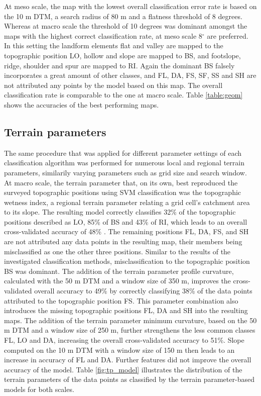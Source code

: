 \documentclass[preprint,12pt,authoryear]{elsarticle}
\begin{document}
At meso scale, the map with the lowest overall classification error rate is based on the 10 m DTM, a search radius of 80 m and a flatness threshold of 8 degrees. Whereas at macro scale the threshold of 10 degrees was dominant amongst the maps with the highest correct classification rate, at meso scale 8$^{\circ}$ are preferred. In this setting the landform elements flat and valley are mapped to the topographic position LO, hollow and slope are mapped to BS, and footslope, ridge, shoulder and spur are mapped to RI. Again the dominant BS falsely incorporates a great amount of other classes, and FL, DA, FS, SF, SS and SH are not attributed any points by the model based on this map. The overall classification rate is comparable to the one at macro scale.  Table \ref{table:geom} shows the accuracies of the best performing maps.

\subsection{Terrain parameters}
The same procedure that was applied for different parameter settings of each classification algorithm was performed for  numerous local and regional terrain parameters, similarily varying parameters such as grid size and search window. At macro scale, the terrain parameter that, on its own, best reproduced the surveyed topographic positions using SVM classification was the topographic wetness index, a regional terrain parameter relating a grid cell's catchment area to its slope. The resulting model correctly classifies 32\% of the topographic positions described as LO, 85\% of BS and 43\% of RI, which leads to an overall cross-validated accuracy of 48\% . The remaining positions FL, DA, FS, and SH are not attributed any data points in the resulting map, their members being misclassified as one the other three positions. Similar to the results of the investigated classification methods, misclassification to the topographic position BS was dominant. The addition of the terrain parameter profile curvature, calculated with the 50 m DTM and a window size of 350 m, improves the cross-validated overall accuracy to 49\% by correctly classifying 38\% of the data points attributed to the topographic position FS. This parameter combination also introduces the missing topographic positions FL, DA and SH into the resulting maps. The addition of the terrain parameter minimum curvature, based on the 50 m DTM and a window size of 250 m, further strengthens the less common classes FL, LO and DA, increasing the overall cross-validated accuracy to 51\%. Slope computed on the 10 m DTM with a window size of 150 m then leads to an increase in accuracy of FL and DA. Further features did not improve the overall accuracy of the model. Table \ref{fig:tp_model} illustrates the distribution of the terrain parameters of the data points as classified by the terrain parameter-based models for both scales.
\end{document}
